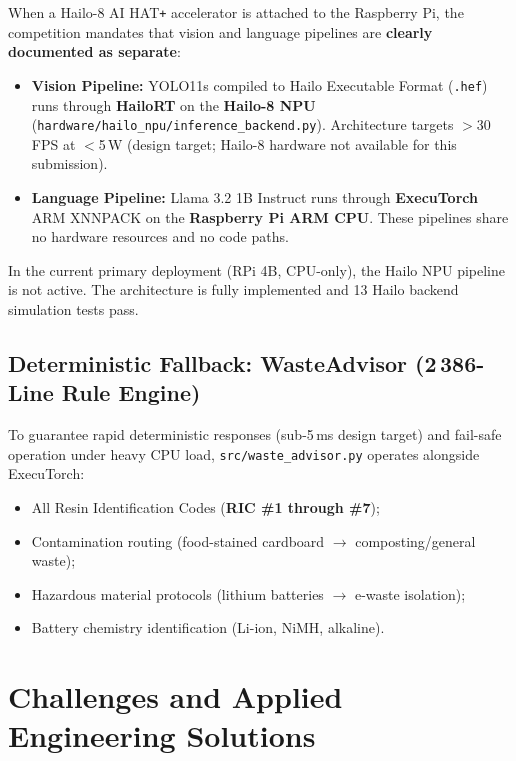 \documentclass[12pt,a4paper]{article}
\begin{document}
\begin{reqbox}
When a Hailo-8 AI HAT\texttt{+} accelerator is attached to the Raspberry Pi, the
competition mandates that vision and language pipelines are \textbf{clearly documented
as separate}:
\begin{itemize}
  \item \textbf{Vision Pipeline:} YOLO11s compiled to Hailo Executable Format (\texttt{.hef})
  runs through \textbf{HailoRT} on the \textbf{Hailo-8 NPU}
  (\texttt{hardware/hailo\_npu/inference\_backend.py}). Architecture targets $>$30\,FPS at $<$5\,W (design target; Hailo-8 hardware not available for this submission).
  \item \textbf{Language Pipeline:} Llama 3.2 1B Instruct runs through
  \textbf{ExecuTorch} ARM XNNPACK on the \textbf{Raspberry Pi ARM CPU}.
  These pipelines share no hardware resources and no code paths.
\end{itemize}
In the current primary deployment (RPi 4B, CPU-only), the Hailo NPU pipeline is not
active. The architecture is fully implemented and 13 Hailo backend simulation tests pass.
\end{reqbox}

\subsection{Deterministic Fallback: WasteAdvisor (2\,386-Line Rule Engine)}

To guarantee rapid deterministic responses (sub-5\,ms design target) and fail-safe
operation under heavy CPU load, \texttt{src/waste\_advisor.py} operates alongside ExecuTorch:
\begin{itemize}
  \item All Resin Identification Codes (\textbf{RIC \#1 through \#7});
  \item Contamination routing (food-stained cardboard $\to$ composting/general waste);
  \item Hazardous material protocols (lithium batteries $\to$ e-waste isolation);
  \item Battery chemistry identification (Li-ion, NiMH, alkaline).
\end{itemize}

\clearpage

\section{Challenges and Applied Engineering Solutions}
\end{document}

